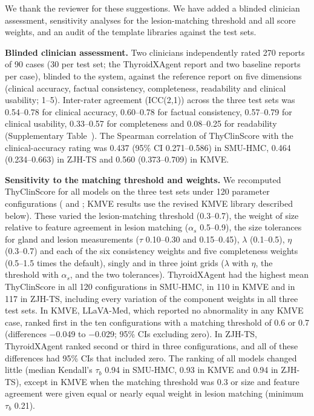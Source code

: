 We thank the reviewer for these suggestions. We have added a blinded clinician assessment, sensitivity analyses for the lesion-matching threshold and all score weights, and an audit of the template libraries against the test sets.\par

\textbf{Blinded clinician assessment.} Two clinicians independently rated 270 reports of 90 cases (30 per test set; the ThyroidXAgent report and two baseline reports per case), blinded to the system, against the reference report on five dimensions (clinical accuracy, factual consistency, completeness, readability and clinical usability; 1--5). Inter-rater agreement (ICC(2,1)) across the three test sets was 0.54--0.78 for clinical accuracy, 0.60--0.78 for factual consistency, 0.57--0.79 for clinical usability, 0.33--0.57 for completeness and 0.08--0.25 for readability (Supplementary Table~\SuppTabClinVal{}). The Spearman correlation of ThyClinScore with the clinical-accuracy rating was 0.437 (95\% CI 0.271--0.586) in SMU-HMC, 0.464 (0.234--0.663) in ZJH-TS and 0.560 (0.373--0.709) in KMVE.\par

\textbf{Sensitivity to the matching threshold and weights.} We recomputed ThyClinScore for all models on the three test sets under 120 parameter configurations ( and ; KMVE results use the revised KMVE library described below). These varied the lesion-matching threshold (0.3--0.7), the weight of size relative to feature agreement in lesion matching ($\alpha_s$ 0.5--0.9), the size tolerances for gland and lesion measurements ($\tau$ 0.10--0.30 and 0.15--0.45), $\lambda$ (0.1--0.5), $\eta$ (0.3--0.7) and each of the six consistency weights and five completeness weights (0.5--1.5 times the default), singly and in three joint grids ($\lambda$ with $\eta$, the threshold with $\alpha_s$, and the two tolerances). ThyroidXAgent had the highest mean ThyClinScore in all 120 configurations in SMU-HMC, in 110 in KMVE and in 117 in ZJH-TS, including every variation of the component weights in all three test sets. In KMVE, LLaVA-Med, which reported no abnormality in any KMVE case, ranked first in the ten configurations with a matching threshold of 0.6 or 0.7 (differences $-$0.049 to $-$0.029; 95\% CIs excluding zero). In ZJH-TS, ThyroidXAgent ranked second or third in three configurations, and all of these differences had 95\% CIs that included zero. The ranking of all models changed little (median Kendall's $\tau_b$ 0.94 in SMU-HMC, 0.93 in KMVE and 0.94 in ZJH-TS), except in KMVE when the matching threshold was 0.3 or size and feature agreement were given equal or nearly equal weight in lesion matching (minimum $\tau_b$ 0.21).\par

